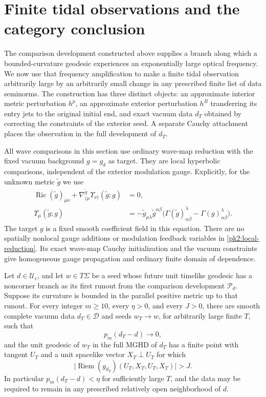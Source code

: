 \section{Finite tidal observations and the category conclusion}
\label{sec:packet}

The comparison development constructed above supplies a branch along
which a bounded-curvature geodesic experiences an exponentially large
optical frequency. We now use that frequency amplification to make a
finite tidal observation arbitrarily large by an arbitrarily small
change in any prescribed finite list of data seminorms. The construction
has three distinct objects: an approximate interior metric perturbation
$h^p$, an approximate exterior perturbation $h^B$ transferring its entry
jets to the original initial end, and exact vacuum data $d_T$ obtained
by correcting the constraints of the exterior seed. A separate Cauchy
attachment places the observation in the full development of $d_T$.

All wave comparisons
in this section use ordinary wave-map reduction with the fixed vacuum
background $g=g_d$ as target. They are local hyperbolic comparisons,
independent of the exterior modulation gauge.
Explicitly, for the unknown metric $\widetilde g$ we use
\begin{equation}
 \begin{split}
 \operatorname{Ric}(\widetilde g)_{\mu\nu}
      +\nabla^{\widetilde g}_{(\mu}
          \Upsilon_{\nu)}(\widetilde g;g)&=0,\\
 \Upsilon_\mu(\widetilde g;g)
   &=-\widetilde g_{\mu\lambda}\widetilde g^{\alpha\beta}
       \bigl(\Gamma(\widetilde g)^\lambda_{\alpha\beta}
                           -\Gamma(g)^\lambda_{\alpha\beta}\bigr).
 \end{split}
 \label{pk2:local-reduction}
\end{equation}
The target $g$ is a fixed smooth coefficient field in this equation.
There are no spatially nonlocal gauge additions or modulation feedback
variables in \eqref{pk2:local-reduction}. Its exact wave-map Cauchy
initialization and the vacuum constraints give homogeneous gauge
propagation and ordinary finite domain of dependence.

\begin{proposition}
\label{pk2:finite-signal}
Let $d\in\mathcal U_\epsilon$, and let $w\in T\Sigma$ be a seed whose future
unit timelike geodesic has a noncorner branch as its first runout from
the comparison development $\mathcal P_d$. Suppose its curvature is
bounded in the parallel positive metric up to that runout. For every
integer $m\ge10$, every $\eta>0$, and every $J>0$, there are smooth
complete vacuum data $d_T\in\mathcal D$ and seeds $w_T\to w$, for
arbitrarily large finite $T$, such that
\[
 p_m(d_T-d)\longrightarrow0,
\]
and the unit geodesic of $w_T$ in the full MGHD of $d_T$ has a finite
point with tangent $U_T$ and a unit spacelike vector $X_T\perp U_T$
for which
\[
 \bigl|\operatorname{Riem}(g_{d_T})(U_T,X_T,U_T,X_T)\bigr|>J.
\]
In particular $p_m(d_T-d)<\eta$ for sufficiently large $T$, and the
data may be required to remain in any prescribed relatively open
neighborhood of $d$.
\end{proposition}


